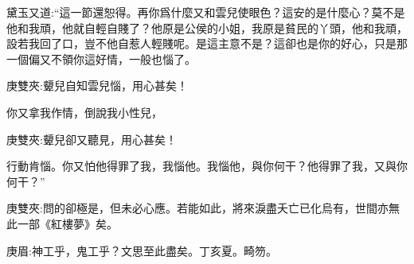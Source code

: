 \begin{parag}
    黛玉又道:“這一節還恕得。再你爲什麼又和雲兒使眼色？這安的是什麼心？莫不是他和我頑，他就自輕自賤了？他原是公侯的小姐，我原是貧民的丫頭，他和我頑，設若我回了口，豈不他自惹人輕賤呢。是這主意不是？這卻也是你的好心，只是那一個偏又不領你這好情，一般也惱了。\begin{note}庚雙夾:顰兒自知雲兒惱，用心甚矣！\end{note}你又拿我作情，倒說我小性兒，\begin{note}庚雙夾:顰兒卻又聽見，用心甚矣！\end{note}行動肯惱。你又怕他得罪了我，我惱他。我惱他，與你何干？他得罪了我，又與你何干？”\begin{note}庚雙夾:問的卻極是，但未必心應。若能如此，將來淚盡夭亡已化烏有，世間亦無此一部《紅樓夢》矣。\end{note}\begin{note}庚眉:神工乎，鬼工乎？文思至此盡矣。丁亥夏。畸笏。\end{note}
\end{parag}


